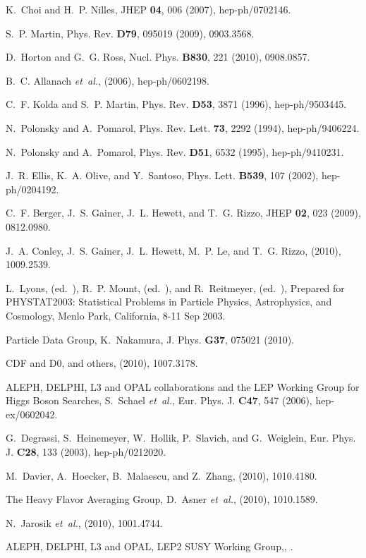 \begin{thebibliography}{10}

K.~Choi and H.~P. Nilles,
\newblock JHEP {\bf 04}, 006 (2007), hep-ph/0702146.

S.~P. Martin,
\newblock Phys. Rev. {\bf D79}, 095019 (2009), 0903.3568.

D.~Horton and G.~G. Ross,
\newblock Nucl. Phys. {\bf B830}, 221 (2010), 0908.0857.

B.~C. Allanach {\em et~al.},
\newblock (2006), hep-ph/0602198.

C.~F. Kolda and S.~P. Martin,
\newblock Phys. Rev. {\bf D53}, 3871 (1996), hep-ph/9503445.

N.~Polonsky and A.~Pomarol,
\newblock Phys. Rev. Lett. {\bf 73}, 2292 (1994), hep-ph/9406224.

N.~Polonsky and A.~Pomarol,
\newblock Phys. Rev. {\bf D51}, 6532 (1995), hep-ph/9410231.

J.~R. Ellis, K.~A. Olive, and Y.~Santoso,
\newblock Phys. Lett. {\bf B539}, 107 (2002), hep-ph/0204192.

C.~F. Berger, J.~S. Gainer, J.~L. Hewett, and T.~G. Rizzo,
\newblock JHEP {\bf 02}, 023 (2009), 0812.0980.

J.~A. Conley, J.~S. Gainer, J.~L. Hewett, M.~P. Le, and T.~G. Rizzo,
\newblock (2010), 1009.2539.

L.~Lyons, (ed.~), R.~P. Mount, (ed.~), and R.~Reitmeyer, (ed.~),
\newblock Prepared for PHYSTAT2003: Statistical Problems in Particle Physics,
  Astrophysics, and Cosmology, Menlo Park, California, 8-11 Sep 2003.

Particle Data Group, K.~Nakamura,
\newblock J. Phys. {\bf G37}, 075021 (2010).

CDF and D0, and others,
\newblock (2010), 1007.3178.

{ALEPH, DELPHI, L3 and OPAL collaborations and the LEP Working Group for Higgs
  Boson Searches}, S.~Schael {\em et~al.},
\newblock Eur. Phys. J. {\bf C47}, 547 (2006), hep-ex/0602042.

G.~Degrassi, S.~Heinemeyer, W.~Hollik, P.~Slavich, and G.~Weiglein,
\newblock Eur. Phys. J. {\bf C28}, 133 (2003), hep-ph/0212020.

M.~Davier, A.~Hoecker, B.~Malaescu, and Z.~Zhang,
\newblock (2010), 1010.4180.

The Heavy Flavor Averaging Group, D.~Asner {\em et~al.},
\newblock (2010), 1010.1589.

N.~Jarosik {\em et~al.},
\newblock (2010), 1001.4744.

ALEPH, DELPHI, L3 and OPAL, {LEP2 SUSY Working Group,},
.

\end{thebibliography}
